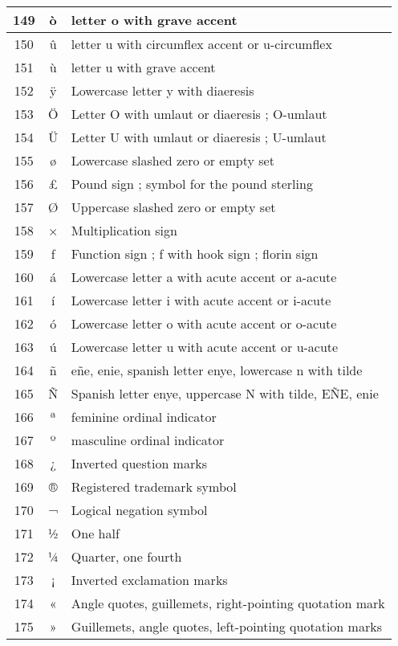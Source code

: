 {\begin{center}
\begin{longtable}{|c|c|l|}
149 & ò & letter o with grave accent \\\hline
150 & û & letter u with circumflex accent or u-circumflex \\\hline
151 & ù & letter u with grave accent \\\hline
152 & ÿ & Lowercase letter y with diaeresis \\\hline
153 & Ö & Letter O with umlaut or diaeresis ; O-umlaut \\\hline
154 & Ü & Letter U with umlaut or diaeresis ; U-umlaut \\\hline
155 & ø & Lowercase slashed zero or empty set \\\hline
156 & £ & Pound sign ; symbol for the pound sterling \\\hline
157 & Ø & Uppercase slashed zero or empty set \\\hline
158 & × & Multiplication sign \\\hline
159 & ƒ & Function sign ; f with hook sign ; florin sign \\\hline
160 & á & Lowercase letter a with acute accent or a-acute \\\hline
161 & í & Lowercase letter i with acute accent or i-acute \\\hline
162 & ó & Lowercase letter o with acute accent or o-acute \\\hline
163 & ú & Lowercase letter u with acute accent or u-acute \\\hline
164 & ñ & eñe, enie, spanish letter enye, lowercase n with tilde \\\hline
165 & Ñ & Spanish letter enye, uppercase N with tilde, EÑE, enie \\\hline
166 & ª & feminine ordinal indicator \\\hline
167 & º & masculine ordinal indicator \\\hline
168 & ¿ & Inverted question marks \\\hline
169 & ® & Registered trademark symbol \\\hline
170 & ¬ & Logical negation symbol \\\hline
171 & ½ & One half \\\hline
172 & ¼ & Quarter, one fourth \\\hline
173 & ¡ & Inverted exclamation marks \\\hline
174 & « & Angle quotes, guillemets, right-pointing quotation mark \\\hline
175 & » & Guillemets, angle quotes, left-pointing quotation marks \\\hline

\end{longtable}
\end{center}}
